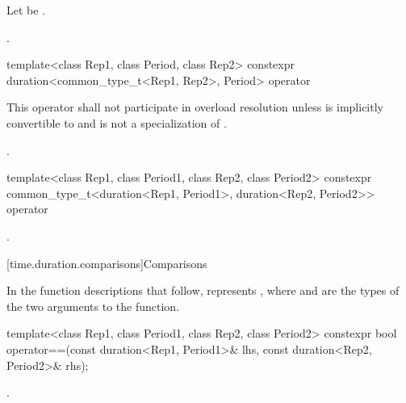 \begin{itemdescr}
\pnum
Let  be
.

\pnum
\returns
{}.
\end{itemdescr}

%
\begin{itemdecl}
template<class Rep1, class Period, class Rep2>
  constexpr duration<common_type_t<Rep1, Rep2>, Period>
    operator%
\end{itemdecl}

\begin{itemdescr}
\pnum
\remarks
This operator shall not participate in overload
resolution unless  is implicitly convertible to  and
 is not a specialization of .

\pnum
\returns
{}.
\end{itemdescr}

%
\begin{itemdecl}
template<class Rep1, class Period1, class Rep2, class Period2>
  constexpr common_type_t<duration<Rep1, Period1>, duration<Rep2, Period2>>
    operator%
\end{itemdecl}

\begin{itemdescr}
\pnum
\returns
{}.
\end{itemdescr}


[time.duration.comparisons]{Comparisons}

\pnum
In the function descriptions that follow,  represents
, where  and  are the types of
the two arguments to the function.

%
\begin{itemdecl}
template<class Rep1, class Period1, class Rep2, class Period2>
  constexpr bool operator==(const duration<Rep1, Period1>& lhs,
                            const duration<Rep2, Period2>& rhs);
\end{itemdecl}

\begin{itemdescr}
\pnum
\returns
{}.
\end{itemdescr}

